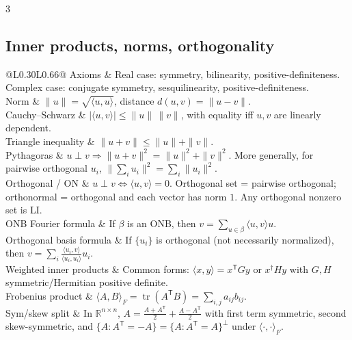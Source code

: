 \documentclass[10pt]{article}
\makeatletter
\newcommand{\R}{\mathbb{R}}
\newcommand{\tr}{\operatorname{tr}}
\newcommand{\ip}[2]{\langle #1,#2\rangle}
\newcommand{\T}{^{\mathsf T}}
\newcommand{\cheattable}[1]{\begin{tabular}{@{}L{0.30\columnwidth}L{0.66\columnwidth}@{}}#1\end{tabular}}
\makeatother
\begin{document}
\begin{multicols}{3}
\subsection*{Inner products, norms, orthogonality}
\cheattable{
Axioms & Real case: symmetry, bilinearity, positive-definiteness. Complex case: conjugate symmetry, sesquilinearity, positive-definiteness.\\
Norm & $\|u\|=\sqrt{\ip{u}{u}}$, distance $d(u,v)=\|u-v\|$.\\
Cauchy--Schwarz & $|\ip{u}{v}|\le \|u\|\,\|v\|$, with equality iff $u,v$ are linearly dependent.\\
Triangle inequality & $\|u+v\|\le \|u\|+\|v\|$.\\
Pythagoras & $u\perp v \Rightarrow \|u+v\|^2=\|u\|^2+\|v\|^2$. More generally, for pairwise orthogonal $u_i$, $\|\sum_i u_i\|^2=\sum_i\|u_i\|^2$.\\
Orthogonal / ON & $u\perp v \iff \ip{u}{v}=0$. Orthogonal set = pairwise orthogonal; orthonormal = orthogonal and each vector has norm $1$. Any orthogonal nonzero set is LI.\\
ONB Fourier formula & If $\beta$ is an ONB, then $v=\sum_{u\in\beta}\ip{u}{v}u$.\\
Orthogonal basis formula & If $\{u_i\}$ is orthogonal (not necessarily normalized), then $v=\sum_i \frac{\ip{u_i}{v}}{\ip{u_i}{u_i}}u_i$.\\
Weighted inner products & Common forms: $\ip{x}{y}=x\T Gy$ or $x^\dagger Hy$ with $G,H$ symmetric/Hermitian positive definite.\\
Frobenius product & $\ip{A}{B}_F=\tr(A\T B)=\sum_{i,j}a_{ij}b_{ij}$.\\
Sym/skew split & In $\R^{n\times n}$, $A=\frac{A+A\T}{2}+\frac{A-A\T}{2}$ with first term symmetric, second skew-symmetric, and $\{A:A\T=-A\}=\{A:A\T=A\}^\perp$ under $\ip{\cdot}{\cdot}_F$.\\
}


\end{multicols}
\end{document}
